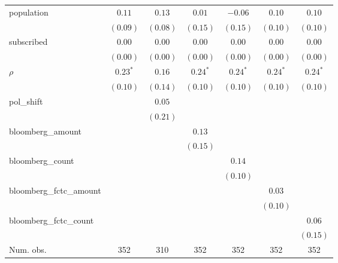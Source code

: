 \begin{table}[!h]
\begin{center}
\begin{tabular}{l c c c c c c }
population              & $0.11$       & $0.13$       & $0.01$       & $-0.06$      & $0.10$       & $0.10$       \\
                        & $(0.09)$     & $(0.08)$     & $(0.15)$     & $(0.15)$     & $(0.10)$     & $(0.10)$     \\
subscribed              & $0.00$       & $0.00$       & $0.00$       & $0.00$       & $0.00$       & $0.00$       \\
                        & $(0.00)$     & $(0.00)$     & $(0.00)$     & $(0.00)$     & $(0.00)$     & $(0.00)$     \\
$\rho$                  & $0.23^{*}$   & $0.16$       & $0.24^{*}$   & $0.24^{*}$   & $0.24^{*}$   & $0.24^{*}$   \\
                        & $(0.10)$     & $(0.14)$     & $(0.10)$     & $(0.10)$     & $(0.10)$     & $(0.10)$     \\
pol\_shift              &              & $0.05$       &              &              &              &              \\
                        &              & $(0.21)$     &              &              &              &              \\
bloomberg\_amount       &              &              & $0.13$       &              &              &              \\
                        &              &              & $(0.15)$     &              &              &              \\
bloomberg\_count        &              &              &              & $0.14$       &              &              \\
                        &              &              &              & $(0.10)$     &              &              \\
bloomberg\_fctc\_amount &              &              &              &              & $0.03$       &              \\
                        &              &              &              &              & $(0.10)$     &              \\
bloomberg\_fctc\_count  &              &              &              &              &              & $0.06$       \\
                        &              &              &              &              &              & $(0.15)$     \\
\midrule
Num. obs.               & 352          & 310          & 352          & 352          & 352          & 352          \\

\end{tabular}
\end{center}
\end{table}
